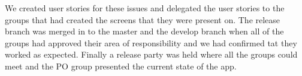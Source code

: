 \noindent We created user stories for these issues and delegated the user stories to the groups that had created the screens that they were present on. 
The release branch was merged in to the master and the develop branch when all of the groups had approved their area of responsibility and we had confirmed tat they worked as expected. 
Finally a release party was held where all the groups could meet and the PO group presented the current state of the app.
